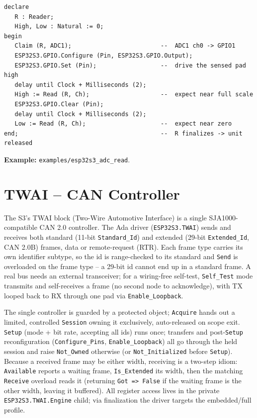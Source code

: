 \begin{lstlisting}
declare
   R : Reader;
   High, Low : Natural := 0;
begin
   Claim (R, ADC1);                         --  ADC1 ch0 -> GPIO1
   ESP32S3.GPIO.Configure (Pin, ESP32S3.GPIO.Output);
   ESP32S3.GPIO.Set (Pin);                  --  drive the sensed pad high
   delay until Clock + Milliseconds (2);
   High := Read (R, Ch);                    --  expect near full scale
   ESP32S3.GPIO.Clear (Pin);
   delay until Clock + Milliseconds (2);
   Low := Read (R, Ch);                     --  expect near zero
end;                                        --  R finalizes -> unit released
\end{lstlisting}

\noindent\textbf{Example:} \texttt{examples/esp32s3\_adc\_read}.

\section{TWAI -- CAN Controller}
\label{app:int:twai}

The S3's TWAI block (Two-Wire Automotive Interface) is a single
SJA1000-compatible CAN 2.0 controller. The Ada driver (\texttt{ESP32S3.TWAI})
sends and receives both standard (11-bit \texttt{Standard\_Id}) and extended
(29-bit \texttt{Extended\_Id}, CAN 2.0B) frames, data or remote-request (RTR).
Each frame type carries its own identifier subtype, so the id is range-checked to
its standard and \texttt{Send} is overloaded on the frame type -- a 29-bit id
cannot end up in a standard frame. A real bus needs an external transceiver; for a
wiring-free self-test, \texttt{Self\_Test} mode transmits and self-receives a
frame (no second node to acknowledge), with TX looped back to RX through one pad
via \texttt{Enable\_Loopback}.

The single controller is guarded by a protected object; \texttt{Acquire} hands out
a limited, controlled \texttt{Session} owning it exclusively, auto-released on
scope exit. \texttt{Setup} (mode + bit rate, accepting all ids) runs once;
transfers and post-\texttt{Setup} reconfiguration (\texttt{Configure\_Pins},
\texttt{Enable\_Loopback}) all go through the held session and raise
\texttt{Not\_Owned} otherwise (or \texttt{Not\_Initialized} before \texttt{Setup}).
Because a received frame may be either width, receiving is a two-step idiom:
\texttt{Available} reports a waiting frame, \texttt{Is\_Extended} its width, then
the matching \texttt{Receive} overload reads it (returning \texttt{Got => False}
if the waiting frame is the other width, leaving it buffered). All register access
lives in the private \texttt{ESP32S3.TWAI.Engine} child; via finalization the
driver targets the embedded/full profile.

